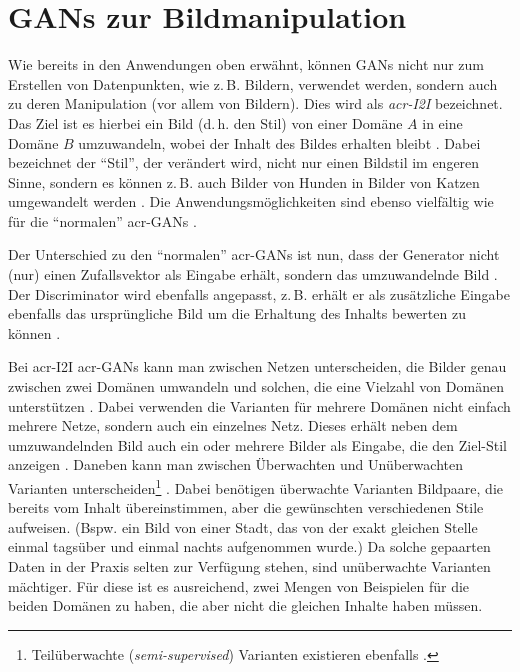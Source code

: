 \section{GANs zur Bildmanipulation}

Wie bereits in den Anwendungen oben erwähnt, können GANs nicht nur zum Erstellen
von Datenpunkten, wie z.\,B. Bildern, verwendet werden, sondern auch zu deren
Manipulation (vor allem von Bildern). Dies wird als \emph{\gls{acr-I2I}}
bezeichnet. Das Ziel ist es hierbei ein Bild (d.\,h. den Stil) von einer Domäne
$A$ in eine Domäne $B$ umzuwandeln, wobei der Inhalt des Bildes erhalten bleibt
\cite[S. 1]{pang2021image}. Dabei bezeichnet der \enquote{Stil}, der verändert wird,
nicht nur einen Bildstil im engeren Sinne, sondern es können z.\,B. auch Bilder
von Hunden in Bilder von Katzen umgewandelt werden \cite{liu2019few}.
Die Anwendungsmöglichkeiten sind ebenso vielfältig wie für die \enquote{normalen}
\gls{acr-GAN}s \cite[vgl.][S. 1]{pang2021image}.

Der Unterschied zu den \enquote{normalen} \gls{acr-GAN}s ist nun, dass der Generator
nicht (nur) einen Zufallsvektor als Eingabe erhält, sondern das umzuwandelnde
Bild \cite[S. 1]{pang2021image}. Der Discriminator wird ebenfalls angepasst, z.\,B. erhält er als
zusätzliche Eingabe ebenfalls das ursprüngliche Bild um die Erhaltung des
Inhalts bewerten zu können \cite{isola2017image}.

Bei \gls{acr-I2I} \gls{acr-GAN}s kann man zwischen Netzen unterscheiden, die
Bilder genau zwischen zwei Domänen umwandeln \cite{isola2017image,
zhu2017unpaired, ledig2017photo, demir2018patch} und solchen, die eine Vielzahl von
Domänen unterstützen
\cite{liu2019few,huang2017arbitrary,saito2020coco,anokhin2020high}. Dabei
verwenden die Varianten für mehrere Domänen nicht einfach mehrere Netze, sondern
auch ein einzelnes
Netz. Dieses erhält neben dem umzuwandelnden Bild auch ein oder mehrere Bilder
als Eingabe, die den Ziel-Stil anzeigen \cites[S.
11]{pang2021image}{liu2019few}.
Daneben kann man zwischen Überwachten \cite{isola2017image,ledig2017photo,demir2018patch} und Unüberwachten
\cite{liu2019few,zhu2017unpaired,huang2017arbitrary,saito2020coco,anokhin2020high,}
Varianten unterscheiden\footnote{Teilüberwachte (\emph{semi-supervised})
Varianten existieren ebenfalls \cite[S. 5]{pang2021image}.}  \cite[vgl.][S. 5,
11]{pang2021image}.
Dabei benötigen
überwachte Varianten Bildpaare, die bereits vom Inhalt übereinstimmen, aber die
gewünschten verschiedenen Stile aufweisen. (Bspw. ein Bild von einer Stadt, das
von der exakt gleichen Stelle einmal tagsüber und einmal nachts aufgenommen
wurde.) Da solche gepaarten Daten in der Praxis selten zur Verfügung stehen,
sind unüberwachte Varianten mächtiger. Für diese ist es ausreichend, zwei Mengen
von Beispielen für die beiden Domänen zu haben, die aber nicht die gleichen
Inhalte haben müssen.